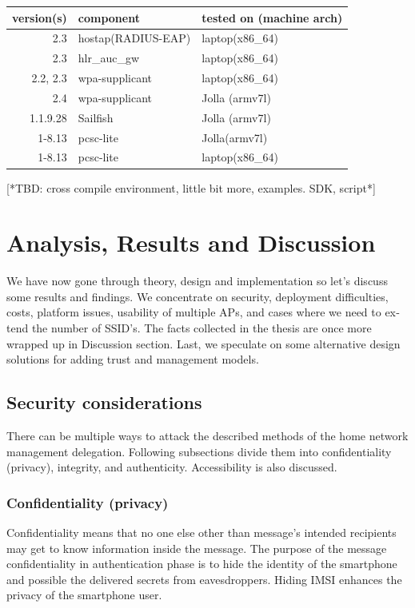 \documentclass[12pt,a4paper,english]{tutthesis}
\begin{document}
\begin{otherlanguage}{english}
\begin{center}
\begin{tabular}{rll}
version(s) & component & tested on (machine arch)\\
\hline
2.3 & hostap(RADIUS-EAP) & laptop(x86\_64)\\
2.3 & hlr\_auc\_gw & laptop(x86\_64)\\
2.2, 2.3 & wpa-supplicant & laptop(x86\_64)\\
2.4 & wpa-supplicant & Jolla (armv7l)\\
1.1.9.28 & Sailfish & Jolla (armv7l)\\
1-8.13 & pcsc-lite & Jolla(armv7l)\\
1-8.13 & pcsc-lite & laptop(x86\_64)\\
\hline
\end{tabular}
\end{center}

[*TBD: cross compile environment, little bit more, examples. SDK,
script*]


\chapter{Analysis, Results and Discussion}
\label{sec-6}

We have now gone through theory, design and implementation so let's
discuss some results and findings. We concentrate on security, 
deployment difficulties, costs, platform issues, usability of multiple
APs, and cases where we
need to extend the number of SSID's. The facts collected in the thesis
are once more wrapped up in Discussion section.
Last, we speculate on some alternative design solutions for adding
trust and management models.


\section{Security considerations}
\label{sec-6-1}



There can be multiple ways to attack the described methods of
the home network management delegation. Following subsections divide them into
confidentiality (privacy), integrity, and
authenticity. Accessibility is also discussed.
\subsection{Confidentiality (privacy)}
\label{sec-6-1-1}

Confidentiality means that no one else other than message's intended
recipients may get to know information inside the message.
The purpose of the message confidentiality in authentication phase is
to hide the identity of the smartphone and possible the delivered
secrets from eavesdroppers. Hiding IMSI enhances the privacy of the smartphone user. 



\end{otherlanguage}
\end{document}
